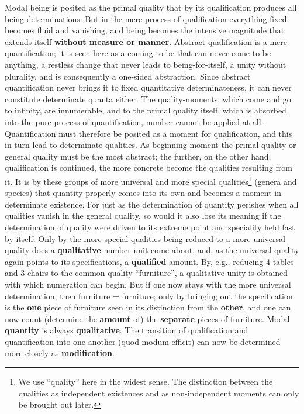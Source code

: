 \documentclass[12pt,a4paper,openany]{book}
\newcommand{\opage}[1]{\marginnote{\footnotesize\textit{[#1]}}}
\begin{document}
Modal being is posited as the primal quality that by its qualification produces all being determinations. But in the mere process of qualification everything fixed becomes fluid and vanishing, and being becomes the intensive magnitude that extends itself \textbf{without measure or manner}. Abstract qualification is a mere quantification; it is seen here as a coming-to-be that can never come to be anything, a restless change that never leads to being-for-itself, a unity without plurality, and is consequently a one-sided abstraction. Since abstract quantification never brings it to fixed quantitative determinateness, it can never constitute determinate quanta either. The quality-moments, which come and go to infinity, are innumerable, and to the primal quality itself, which is absorbed into the pure process of quantification, number cannot be applied at all. Quantification must therefore be posited as a moment for qualification, and this in turn lead to determinate qualities. As beginning-moment the primal quality or general quality must be the most abstract; the further, on the other hand, qualification is continued, the more concrete %
\setcounter{footnote}{0}%
\opage{55}become the qualities resulting from it. It is by these groups of more universal and more special qualities\footnote{We use ``quality'' here in the widest sense. The distinction between the qualities as independent existences and as non-independent moments can only be brought out later.} (genera and species) that quantity properly comes into its own and becomes a moment in determinate existence. For just as the determination of quantity perishes when all qualities vanish in the general quality, so would it also lose its meaning if the determination of quality were driven to its extreme point and speciality held fast by itself. Only by the more special qualities being reduced to a more universal quality does a \textbf{qualitative} number-unit come about, and, as the universal quality again points to its specifications, a \textbf{qualified} amount. By, e.g., reducing 4 tables and 3 chairs to the common quality ``furniture'', a qualitative unity is obtained with which numeration can begin. But if one now stays with the more universal determination, then furniture = furniture; only by bringing out the specification is the \textbf{one} piece of furniture seen in its distinction from the \textbf{other}, and one can now count (determine the \textbf{amount} of) the \textbf{separate} pieces of furniture. Modal \textbf{quantity} is always \textbf{qualitative}. The transition of qualification and quantification into one another (quod modum efficit) can now be determined more closely as \textbf{modification}.
\end{document}
